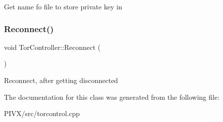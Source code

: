 Get name fo file to store private key in \mbox{\label{class_tor_controller_ae5d4304836fce79574ec540c5ada8269}} 
\subsubsection{\texorpdfstring{Reconnect()}{Reconnect()}}
{\footnotesize\ttfamily void Tor\+Controller\+::\+Reconnect (\begin{DoxyParamCaption}{ }\end{DoxyParamCaption})}

Reconnect, after getting disconnected 

The documentation for this class was generated from the following file\+:\begin{DoxyCompactItemize}
\item 
P\+I\+V\+X/src/torcontrol.\+cpp\end{DoxyCompactItemize}
